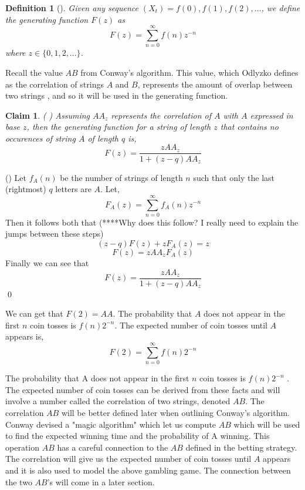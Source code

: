 \documentclass{article}
\newtheorem{definition}[theorem]{Definition}
\newtheorem{claim}[theorem]{Claim}
\numberwithin{mytheorem}{subsection} %
\begin{document}

		\begin{definition}[\cite{enumerate}]
			Given any sequence $(X_t) = f(0), f(1), f(2), ...$, we define the {\em generating function} $F(z)$ as
			$$F(z) = \sum_{n=0}^\infty f(n) z^{-n}$$
			where $z \in \{0, 1, 2, ...\}$.
		\end{definition}

		Recall the value $AB$ from Conway's algorithm. This value, which Odlyzko defines as the correlation of strings $A$ and $B$, represents the amount of overlap between two strings \cite{enumerate}, and so it will be used in the generating function. 

		\begin{claim} (\cite{enumerate} \cite{gardner})
			Assuming $AA_z$ represents the correlation of $A$ with $A$ expressed in base $z$, then the generating function for a string of length $z$ that contains no occurences of string $A$ of length $q$ is, 
			$$F(z) = \frac{zAA_z}{1+(z-q)AA_z}$$
		\end{claim}

		\begin{PROOF} (\cite{enumerate})
			Let $f_A(n)$ be the number of strings of length $n$ such that only the last (rightmost) $q$ letters are $A$. Let,
			$$F_A(z) = \sum^{\infty}_{n=0} f_A(n)z^{-n}$$ 
			Then it follows both that (****Why does this follow? I really need to explain the jumps between these steps) 
			$$(z-q)F(z) + zF_A(z) = z$$
			$$F(z) = zAA_zF_A(z)$$
			Finally we can see that 
			$$F(z) = \frac{zAA_z}{1+(z-q)AA_z}$$ 
			\qed
		\end{PROOF}

		We can get that $F(2) = AA$.
		The probability that $A$ does not appear in the first $n$ coin tosses is $f(n)2^{-n}$. The expected number of coin tosses until $A$ appears is,
		$$F(2) = \sum_{n=0}^\infty f(n) 2^{-n}$$

		The probability that A does not appear in the first $n$ coin tosses is $f(n)2^{-n}$ \cite{enumerate}. The expected number of coin tosses can be derived from these facts and will involve a number called the correlation of two strings, denoted $AB$. The correlation $AB$ will be better defined later when outlining Conway's algorithm. Conway devised a "magic algorithm" which let us compute $AB$ which will be used to find the expected winning time and the probability of A winning. This operation $AB$ has a careful connection to the $AB$ defined in the betting strategy. The correlation will give us the expected number of coin tosses until $A$ appears and it is also used to model the above gambling game. The connection between the two $AB$'s will come in a later section.
\end{document}

